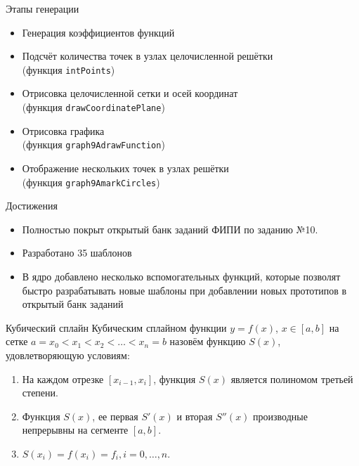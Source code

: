 \documentclass[aspectratio=169,12pt]{beamer}
\begin{document}
\begin{frame}{Этапы генерации}
    \begin{itemize}
        \item Генерация коэффициентов функций
        \item Подсчёт количества точек в узлах целочисленной решётки  \\(функция \texttt{intPoints})
        \item Отрисовка целочисленной сетки и осей координат  \\(функция \texttt{drawCoordinatePlane})
        \item Отрисовка графика  \\(функция \texttt{graph9AdrawFunction})
        \item Отображение нескольких точек в узлах решётки  \\(функция \texttt{graph9AmarkCircles})
    \end{itemize}
    
\end{frame}

\begin{frame}{Достижения}
    \begin{itemize}
        \item Полностью покрыт открытый банк заданий ФИПИ по заданию №10.
        \item Разработано 35 шаблонов
        \item В ядро добавлено несколько вспомогательных функций, которые позволят быстро разрабатывать новые шаблоны при добавлении новых прототипов в открытый банк заданий
    \end{itemize}
    
\end{frame}

\begin{frame}{Кубический сплайн}
    Кубическим сплайном функции $y = f (x)$, $x\in[a, b]$ на сетке $a=x_0<x_1<x_2< \dots <x_n=b$ назовём функцию $S(x)$, удовлетворяющую условиям:
    \begin{enumerate}
        \item На каждом отрезке $[x_{i-1},x_i]$, функция $S (x)$ является полиномом третьей степени.
        \item Функция $S (x)$, ее первая $S' (x)$ и вторая $S'' (x)$ производные непрерывны на сегменте $[a, b]$.
        \item $S (x_i)=f (x_i)=f_i, i=0,\dots,n$.
\end{enumerate}
\end{frame}  
\end{document}
